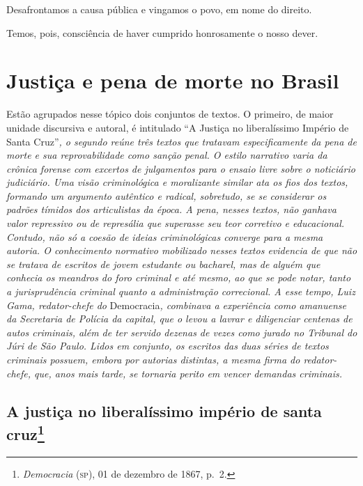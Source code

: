 Desafrontamos a causa pública e vingamos o povo, em nome do direito.

Temos, pois, consciência de haver cumprido honrosamente o nosso dever.

\part{Justiça e pena de morte no Brasil} %

\begin{argumento}
Estão agrupados nesse tópico dois conjuntos de textos. O primeiro, de
maior unidade discursiva e autoral, é intitulado ``A Justiça no
liberalíssimo Império de Santa Cruz''\emph{, o segundo reúne três textos
que tratavam especificamente da pena de morte e sua reprovabilidade como
sanção penal. O estilo narrativo varia da crônica forense com excertos
de julgamentos para o ensaio livre sobre o noticiário judiciário. Uma
visão criminológica e moralizante similar ata os fios dos textos,
formando um argumento autêntico e radical, sobretudo, se se considerar
os padrões tímidos dos articulistas da época. A pena, nesses textos, não
ganhava valor repressivo ou de represália que superasse seu teor
corretivo e educacional. Contudo, não só a coesão de ideias
criminológicas converge para a mesma autoria. O conhecimento normativo
mobilizado nesses textos evidencia de que não se tratava de escritos de
jovem estudante ou bacharel, mas de alguém que conhecia os meandros do
foro criminal e até mesmo, ao que se pode notar, tanto a jurisprudência
criminal quanto a administração correcional. A esse tempo, Luiz Gama,
redator-chefe do} Democracia\emph{, combinava a experiência como
amanuense da Secretaria de Polícia da capital, que o levou a lavrar e
diligenciar centenas de autos criminais, além de ter servido dezenas de
vezes como jurado no Tribunal do Júri de São Paulo. Lidos em conjunto,
os escritos das duas séries de textos criminais possuem, embora por
autorias distintas, a mesma firma do redator-chefe, que, anos mais
tarde, se tornaria perito em vencer demandas criminais.}
\end{argumento}

\chapter{A justiça no liberalíssimo império de santa cruz\footnote{\emph{Democracia} (\textsc{sp}), 01 de dezembro de 1867, p.~2.}}

